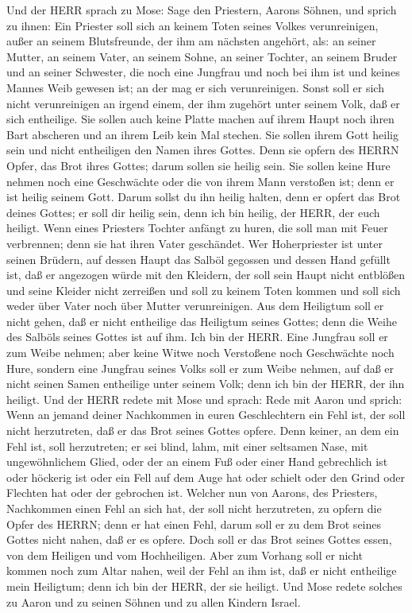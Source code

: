 Und der HERR sprach zu Mose: Sage den Priestern, Aarons
Söhnen, und sprich zu ihnen: Ein Priester soll sich an keinem Toten
seines Volkes verunreinigen,  außer an seinem Blutsfreunde,
der ihm am nächsten angehört, als: an seiner Mutter, an seinem Vater, an
seinem Sohne, an seiner Tochter, an seinem Bruder  und an
seiner Schwester, die noch eine Jungfrau und noch bei ihm ist und keines
Mannes Weib gewesen ist; an der mag er sich verunreinigen. 
Sonst soll er sich nicht verunreinigen an irgend einem, der ihm zugehört
unter seinem Volk, daß er sich entheilige.  Sie sollen auch
keine Platte machen auf ihrem Haupt noch ihren Bart abscheren und an
ihrem Leib kein Mal stechen.  Sie sollen ihrem Gott heilig
sein und nicht entheiligen den Namen ihres Gottes. Denn sie opfern des
HERRN Opfer, das Brot ihres Gottes; darum sollen sie heilig sein.
 Sie sollen keine Hure nehmen noch eine Geschwächte oder die
von ihrem Mann verstoßen ist; denn er ist heilig seinem Gott.
 Darum sollst du ihn heilig halten, denn er opfert das Brot
deines Gottes; er soll dir heilig sein, denn ich bin heilig, der HERR,
der euch heiligt.  Wenn eines Priesters Tochter anfängt zu
huren, die soll man mit Feuer verbrennen; denn sie hat ihren Vater
geschändet.  Wer Hoherpriester ist unter seinen Brüdern,
auf dessen Haupt das Salböl gegossen und dessen Hand gefüllt ist, daß er
angezogen würde mit den Kleidern, der soll sein Haupt nicht entblößen
und seine Kleider nicht zerreißen  und soll zu keinem Toten
kommen und soll sich weder über Vater noch über Mutter verunreinigen.
 Aus dem Heiligtum soll er nicht gehen, daß er nicht
entheilige das Heiligtum seines Gottes; denn die Weihe des Salböls
seines Gottes ist auf ihm. Ich bin der HERR.  Eine Jungfrau
soll er zum Weibe nehmen;  aber keine Witwe noch Verstoßene
noch Geschwächte noch Hure, sondern eine Jungfrau seines Volks soll er
zum Weibe nehmen,  auf daß er nicht seinen Samen entheilige
unter seinem Volk; denn ich bin der HERR, der ihn heiligt. 
Und der HERR redete mit Mose und sprach:  Rede mit Aaron
und sprich: Wenn an jemand deiner Nachkommen in euren Geschlechtern ein
Fehl ist, der soll nicht herzutreten, daß er das Brot seines Gottes
opfere.  Denn keiner, an dem ein Fehl ist, soll
herzutreten; er sei blind, lahm, mit einer seltsamen Nase, mit
ungewöhnlichem Glied,  oder der an einem Fuß oder einer
Hand gebrechlich ist  oder höckerig ist oder ein Fell auf
dem Auge hat oder schielt oder den Grind oder Flechten hat oder der
gebrochen ist.  Welcher nun von Aarons, des Priesters,
Nachkommen einen Fehl an sich hat, der soll nicht herzutreten, zu opfern
die Opfer des HERRN; denn er hat einen Fehl, darum soll er zu dem Brot
seines Gottes nicht nahen, daß er es opfere.  Doch soll er
das Brot seines Gottes essen, von dem Heiligen und vom Hochheiligen.
 Aber zum Vorhang soll er nicht kommen noch zum Altar
nahen, weil der Fehl an ihm ist, daß er nicht entheilige mein Heiligtum;
denn ich bin der HERR, der sie heiligt.  Und Mose redete
solches zu Aaron und zu seinen Söhnen und zu allen Kindern Israel.


